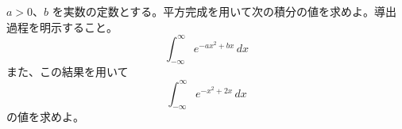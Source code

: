 
$a > 0$、$b$ を実数の定数とする。平方完成を用いて次の積分の値を求めよ。導出過程を明示すること。
\[
\int_{-\infty}^{\infty} e^{-a x^{2} + b x}\, dx
\]
また、この結果を用いて
\[
\int_{-\infty}^{\infty} e^{-x^{2} + 2x}\, dx
\]
の値を求めよ。
